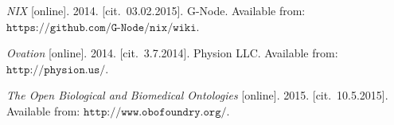 \documentclass[conference]{IEEEtran}
\begin{document}
\begin{thebibliography}{1}
\emph{NIX} [online]. 2014. [cit.~03.02.2015]. G-Node.
\newblock Available from: $\texttt{{https://github.com/G-Node/nix/wiki}}$.

\emph{Ovation} [online]. 2014. [cit.~3.7.2014]. Physion LLC.
\newblock Available from: $\texttt{{http://physion.us/}}$.


\emph{The Open Biological and Biomedical Ontologies} [online]. 2015.
[cit.~10.5.2015].
\newblock Available from: $\texttt{{http://www.obofoundry.org/}}$.
\end{thebibliography}




\end{document}
